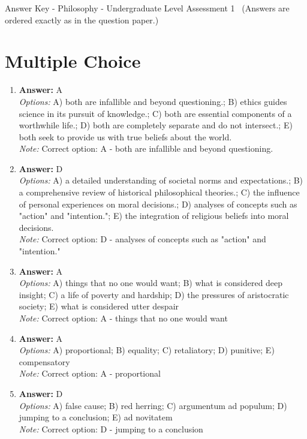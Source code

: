 \documentclass[12pt]{article}
\begin{document}
\begin{center}
Answer Key - Philosophy - Undergraduate Level Assessment 1 \
\small (Answers are ordered exactly as in the question paper.)
\end{center}

\section*{Multiple Choice}
\begin{enumerate}[label=\arabic*.]
\item \textbf{Answer:} A
\\ \textit{Options:} A) both are infallible and beyond questioning.; B) ethics guides science in its pursuit of knowledge.; C) both are essential components of a worthwhile life.; D) both are completely separate and do not intersect.; E) both seek to provide us with true beliefs about the world.
\\ \textit{Note:} Correct option: A - both are infallible and beyond questioning.
\item \textbf{Answer:} D
\\ \textit{Options:} A) a detailed understanding of societal norms and expectations.; B) a comprehensive review of historical philosophical theories.; C) the influence of personal experiences on moral decisions.; D) analyses of concepts such as "action" and "intention."; E) the integration of religious beliefs into moral decisions.
\\ \textit{Note:} Correct option: D - analyses of concepts such as "action" and "intention."
\item \textbf{Answer:} A
\\ \textit{Options:} A) things that no one would want; B) what is considered deep insight; C) a life of poverty and hardship; D) the pressures of aristocratic society; E) what is considered utter despair
\\ \textit{Note:} Correct option: A - things that no one would want
\item \textbf{Answer:} A
\\ \textit{Options:} A) proportional; B) equality; C) retaliatory; D) punitive; E) compensatory
\\ \textit{Note:} Correct option: A - proportional
\item \textbf{Answer:} D
\\ \textit{Options:} A) false cause; B) red herring; C) argumentum ad populum; D) jumping to a conclusion; E) ad novitatem
\\ \textit{Note:} Correct option: D - jumping to a conclusion
\end{enumerate}
\end{document}
